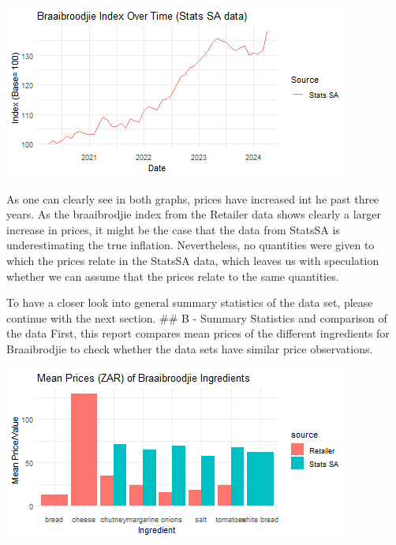\documentclass[11pt,preprint, authoryear]{elsarticle}
\let\origfigure\figure
\let\endorigfigure\endfigure
\renewenvironment{figure}[1][2] {
    \expandafter\origfigure\expandafter[H]
} {
    \endorigfigure
}
\numberwithin{equation}{section}
\numberwithin{figure}{section}
\numberwithin{table}{section}
\begin{document}
\begin{figure}[H]

{\centering \includegraphics{Question5_files/figure-latex/Figure2-1} 

}

\caption{Braaibrodjie Index Stats SA \label{Figure2}}\label{fig:Figure2}
\end{figure}

As one can clearly see in both graphs, prices have increased int he past
three years. As the braaibrodjie index from the Retailer data shows
clearly a larger increase in prices, it might be the case that the data
from StatsSA is underestimating the true inflation. Nevertheless, no
quantities were given to which the prices relate in the StatsSA data,
which leaves us with speculation whether we can assume that the prices
relate to the same quantities.

To have a closer look into general summary statistics of the data set,
please continue with the next section. \#\# B - Summary Statistics and
comparison of the data First, this report compares mean prices of the
different ingredients for Braaibrodjie to check whether the data sets
have similar price observations.

\begin{figure}[H]

{\centering \includegraphics{Question5_files/figure-latex/Figure3-1} 

}

\caption{Summary Statistics \label{Figure3}}\label{fig:Figure3}
\end{figure}
\end{document}
